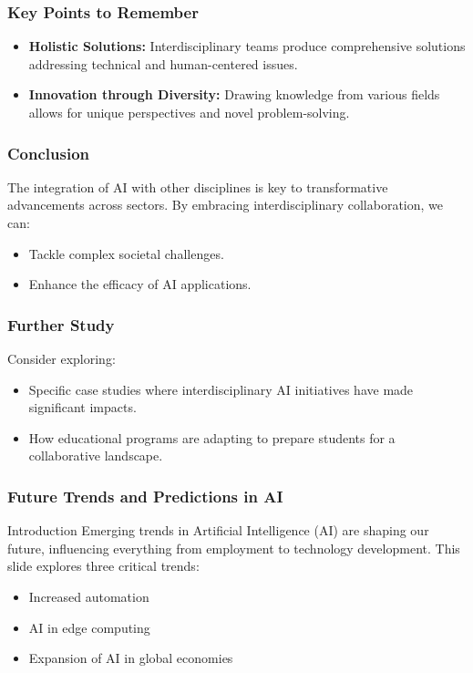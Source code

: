 \documentclass[aspectratio=169]{beamer}
\begin{document}
\begin{frame}[fragile]
    \frametitle{Key Points to Remember}
    \begin{itemize}
        \item \textbf{Holistic Solutions:} Interdisciplinary teams produce comprehensive solutions addressing technical and human-centered issues.
        \item \textbf{Innovation through Diversity:} Drawing knowledge from various fields allows for unique perspectives and novel problem-solving.
    \end{itemize}
\end{frame}

\begin{frame}[fragile]
    \frametitle{Conclusion}
    The integration of AI with other disciplines is key to transformative advancements across sectors. By embracing interdisciplinary collaboration, we can:
    \begin{itemize}
        \item Tackle complex societal challenges.
        \item Enhance the efficacy of AI applications.
    \end{itemize}
\end{frame}

\begin{frame}[fragile]
    \frametitle{Further Study}
    Consider exploring:
    \begin{itemize}
        \item Specific case studies where interdisciplinary AI initiatives have made significant impacts.
        \item How educational programs are adapting to prepare students for a collaborative landscape.
    \end{itemize}
\end{frame}

\begin{frame}[fragile]
    \frametitle{Future Trends and Predictions in AI}
    \begin{block}{Introduction}
        Emerging trends in Artificial Intelligence (AI) are shaping our future, influencing everything from employment to technology development.
        This slide explores three critical trends:
        \begin{itemize}
            \item Increased automation
            \item AI in edge computing
            \item Expansion of AI in global economies
        \end{itemize}
    \end{block}
\end{frame}
\end{document}
